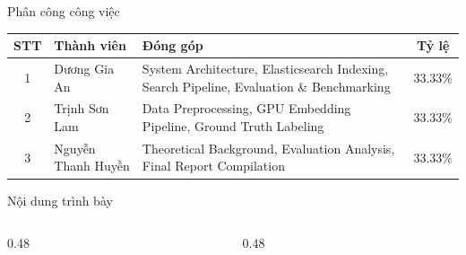 \begin{frame}{Phân công công việc}
\begin{center}
\renewcommand{\arraystretch}{1.3}
{\small
\begin{tabular}{c l p{6.8cm} c}
\toprule
\textbf{STT} & \textbf{Thành viên} & \textbf{Đóng góp} & \textbf{Tỷ lệ} \\
\midrule
1 & Dương Gia An & System Architecture, Elasticsearch Indexing, Search Pipeline, Evaluation \& Benchmarking & 33.33\% \\
\hline
2 & Trịnh Sơn Lam & Data Preprocessing, GPU Embedding Pipeline, Ground Truth Labeling & 33.33\% \\
\hline
3 & Nguyễn Thanh Huyền & Theoretical Background, Evaluation Analysis, Final Report Compilation & 33.33\% \\
\bottomrule
\end{tabular}
}
\end{center}
\end{frame}

\begin{frame}{Nội dung trình bày}
\begin{columns}[T]
\begin{column}{0.48\textwidth}
\tableofcontents[sections={1-4}]
\end{column}
\begin{column}{0.48\textwidth}
\tableofcontents[sections={5-8}]
\end{column}
\end{columns}
\end{frame}
